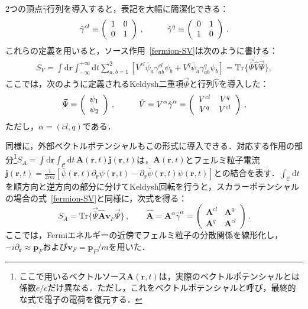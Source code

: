 \documentclass[a4paper,11pt]{ltjsarticle}
\def\Tr{\mathrm{Tr}}
\def\d{\mathrm{d}}
\def\rt{(\mathbf{r},t)}
\begin{document}
2つの頂点$\hat \gamma$行列を導入すると，表記を大幅に簡潔化できる：
\begin{equation}\label{fermion-gammas}
\hat{\gamma}^{cl} \equiv \left( \begin{array}{cc}
 1 & 0   \\
 0 & 1
 \end{array} \right)\, , \hskip 1cm
\hat{\gamma}^{q} \equiv \left( \begin{array}{cc}
 0 & 1   \\
 1 & 0
 \end{array} \right)\, .
\end{equation}
これらの定義を用いると，ソース作用~\eqref{fermion-SV}は次のように書ける：
\begin{eqnarray}\label{fermion-SV-1}
S_{V}=\int\d\mathbf{r}\int^{+\infty}_{-\infty}\d
t\sum^{2}_{a,b=1}\left[V^{cl}\bar{\psi}_{a}\gamma^{cl}_{ab}\psi_{b}+
V^{q}\bar{\psi}_{a}\gamma^{q}_{ab}\psi_{b}\right]
=\Tr\big\{\vec{\bar{\Psi}}\hat{V}\vec{\Psi}\big\},
\end{eqnarray}
ここでは，次のように定義されるKeldysh二重項$\vec{\Psi}$と行列$\hat{V}$を導入した：
\begin{equation}
\vec{\Psi}=\left(\begin{array}{c}\psi_{1} \\
\psi_{2}\end{array}\right)\,,\hskip 1cm
\hat{V}=V^{\alpha}\hat\gamma^{\alpha}= \left(\begin{array}{cc}V^{cl} & V^{q} \\
V^{q} & V^{cl}\end{array}\right)\,,
\end{equation}
ただし，$\alpha=(cl,q)$である．



同様に，外部ベクトルポテンシャルもこの形式に導入できる．対応する作用の部分\footnote{ここで用いるベクトルソース$\mathbf{A}\rt$は，実際のベクトルポテンシャルとは係数$e/c$だけ異なる．ただし，これをベクトルポテンシャルと呼び，最終的な式で電子の電荷を復元する．}$S_{A}=\int\d\mathbf{r}\int_{\mathcal{C}}\d
t\, \mathbf{A}\rt\mathbf{j}\rt$は，$\mathbf{A}\rt$とフェルミ粒子電流$\mathbf{j}\rt=\frac{1}{2mi}[\bar{\psi}\rt\partial_{\mathbf{r}}\psi\rt-
\partial_{\mathbf{r}}\bar{\psi}\rt\psi\rt]$との結合を表す．$\int_{\mathcal{C}}\d t$を順方向と逆方向の部分に分けてKeldysh回転を行うと，スカラーポテンシャルの場合の式~\eqref{fermion-SV}と同様に，次式を得る：
\begin{equation}\label{fermion-SA}
S_{A}=\Tr\big\{\vec{\bar{\Psi}} \hat{\mathbf{A}}\mathbf{v}_{F}
 \vec{\Psi}\big\}\,,\qquad
\hat{\mathbf{A}}=\mathbf{A}^{\alpha}\hat{\gamma}^{\alpha}=
\left(\begin{array}{cc}\mathbf{A}^{cl} & \mathbf{A}^{q} \\
\mathbf{A}^{q} & \mathbf{A}^{cl}\end{array}\right)\,.
\end{equation}
ここでは，Fermiエネルギーの近傍でフェルミ粒子の分散関係を線形化し，$-i\partial_{\mathbf{r}}\approx \mathbf{p}_{F}$および$\mathbf{v}_{F}=\mathbf{p}_{F}/m$を用いた．
\end{document}

